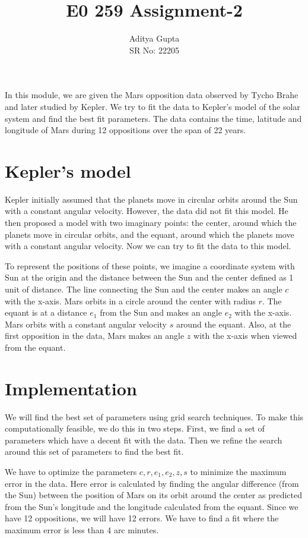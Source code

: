 \documentclass[12pt]{article}
\title{\vspace{-1.5cm}E0 259 Assignment-2}
\author{Aditya Gupta \\
SR No: 22205}
\date{}
\begin{document}
\maketitle

\vspace{-0.5cm}
In this module, we are given the Mars opposition data observed by Tycho Brahe and later studied by Kepler. We try to fit the data to Kepler's model of the solar system and find the best fit parameters. The data contains the time, latitude and longitude of Mars during 12 oppositions over the span of 22 years.

\section*{Kepler's model}
Kepler initially assumed that the planets move in circular orbits around the Sun with a constant angular velocity. However, the data did not fit this model. He then proposed a model with two imaginary points: the center, around which the planets move in circular orbits, and the equant, around which the planets move with a constant angular velocity. Now we can try to fit the data to this model.

To represent the positions of these points, we imagine a coordinate system with Sun at the origin and the distance between the Sun and the center defined as 1 unit of distance. The line connecting the Sun and the center makes an angle $c$ with the x-axis. Mars orbits in a circle around the center with radius $r$. The equant is at a distance $e_1$ from the Sun and makes an angle $e_2$ with the x-axis. Mars orbits with a constant angular velocity $s$ around the equant. Also, at the first opposition in the data, Mars makes an angle $z$ with the x-axis when viewed from the equant.


\section*{Implementation}
We will find the best set of parameters using grid search techniques. To make this computationally feasible, we do this in two steps. First, we find a set of parameters which have a decent fit with the data. Then we refine the search around this set of parameters to find the best fit.

We have to optimize the parameters $c, r, e_1, e_2, z, s$ to minimize the maximum error in the data. Here error is calculated by finding the angular difference (from the Sun) between the position of Mars on its orbit around the center as predicted from the Sun's longitude and the longitude calculated from the equant. Since we have 12 oppositions, we will have 12 errors. We have to find a fit where the maximum error is less than 4 arc minutes.
\end{document}
